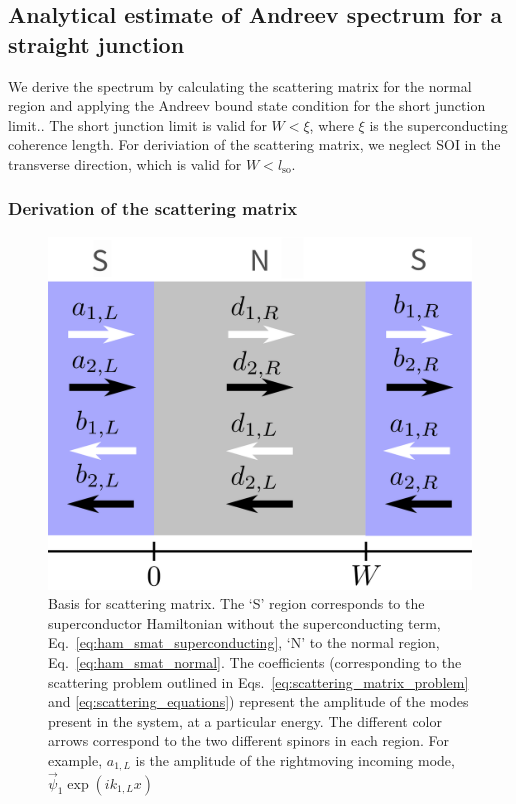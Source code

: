 	\subsection{Analytical estimate of Andreev spectrum for a straight junction}
		
		We derive the spectrum by calculating the scattering matrix for the normal region and applying the Andreev bound state condition for the short junction limit\cite{beenakker_universal_1991,sticlet_robustness_2017}.. 
		The short junction limit is valid for $W<\xi$, where $\xi$ is the superconducting coherence length.
		For deriviation of the scattering matrix, we neglect SOI in the transverse direction, which is valid for $W<l_\text{so}$.

		\subsubsection{Derivation of the scattering matrix}

			\begin{figure}[!htb]
			\centering
			\includegraphics[width=0.75\columnwidth]{images/scattering}
			\caption{Basis for scattering matrix. 
			The `S' region corresponds to the superconductor Hamiltonian without the superconducting term, Eq.~\eqref{eq:ham_smat_superconducting}, `N' to the normal region, Eq.~\eqref{eq:ham_smat_normal}. 
			The coefficients (corresponding to the scattering problem outlined in Eqs.~\ref{eq:scattering_matrix_problem} and \ref{eq:scattering_equations}) represent the amplitude of the modes present in the system, at a particular energy.
			The different color arrows correspond to the two different spinors in each region.
			For example, $a_{1,L}$ is the amplitude of the rightmoving incoming mode, $\vec{\psi}_1 \exp\left(i k_{1,L} x\right)$}
			\label{fig:scattering}
			\end{figure}
			
